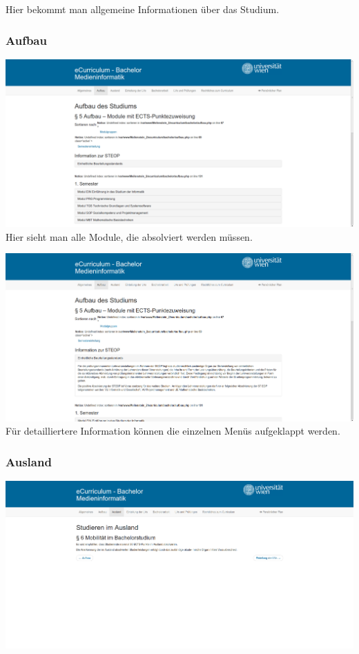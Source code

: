 \documentclass[a4paper,10pt]{scrartcl}
\begin{document}
Hier bekommt man allgemeine Informationen über das Studium.

\subsubsection*{Aufbau}

\includegraphics[scale=0.19]{./hifi_screenshots/hifi_aufbau1.png}\\

Hier sieht man alle Module, die absolviert werden müssen.

\includegraphics[scale=0.19]{./hifi_screenshots/hifi_aufbau2.png}\\

Für detailliertere Information können die einzelnen Menüs aufgeklappt werden.

\subsubsection*{Ausland}

\includegraphics[scale=0.19]{./hifi_screenshots/hifi_ausland.png}\\
\end{document}
